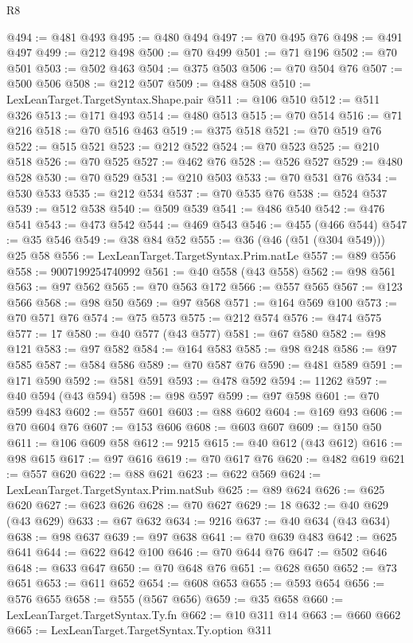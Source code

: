 \begin{lexlean}{R8}
\begin{coremodule}
@494 := @481 @493
@495 := @480 @494
@497 := @70 @495 @76
@498 := @491 @497
@499 := @212 @498
@500 := @70 @499
@501 := @71 @196
@502 := @70 @501
@503 := @502 @463
@504 := @375 @503
@506 := @70 @504 @76
@507 := @500 @506
@508 := @212 @507
@509 := @488 @508
@510 := LexLeanTarget.TargetSyntax.Shape.pair
@511 := @106 @510
@512 := @511 @326
@513 := @171 @493
@514 := @480 @513
@515 := @70 @514
@516 := @71 @216
@518 := @70 @516 @463
@519 := @375 @518
@521 := @70 @519 @76
@522 := @515 @521
@523 := @212 @522
@524 := @70 @523
@525 := @210 @518
@526 := @70 @525
@527 := @462 @76
@528 := @526 @527
@529 := @480 @528
@530 := @70 @529
@531 := @210 @503
@533 := @70 @531 @76
@534 := @530 @533
@535 := @212 @534
@537 := @70 @535 @76
@538 := @524 @537
@539 := @512 @538
@540 := @509 @539
@541 := @486 @540
@542 := @476 @541
@543 := @473 @542
@544 := @469 @543
@546 := @455 (@466 @544)
@547 := @35 @546
@549 := @38 @84 @52
@555 := @36 (@46 (@51 (@304 @549))) @25 @58
@556 := LexLeanTarget.TargetSyntax.Prim.natLe
@557 := @89 @556
@558 := 9007199254740992
@561 := @40 @558 (@43 @558)
@562 := @98 @561
@563 := @97 @562
@565 := @70 @563 @172
@566 := @557 @565
@567 := @123 @566
@568 := @98 @50
@569 := @97 @568
@571 := @164 @569 @100
@573 := @70 @571 @76
@574 := @75 @573
@575 := @212 @574
@576 := @474 @575
@577 := 17
@580 := @40 @577 (@43 @577)
@581 := @67 @580
@582 := @98 @121
@583 := @97 @582
@584 := @164 @583
@585 := @98 @248
@586 := @97 @585
@587 := @584 @586
@589 := @70 @587 @76
@590 := @481 @589
@591 := @171 @590
@592 := @581 @591
@593 := @478 @592
@594 := 11262
@597 := @40 @594 (@43 @594)
@598 := @98 @597
@599 := @97 @598
@601 := @70 @599 @483
@602 := @557 @601
@603 := @88 @602
@604 := @169 @93
@606 := @70 @604 @76
@607 := @153 @606
@608 := @603 @607
@609 := @150 @50
@611 := @106 @609 @58
@612 := 9215
@615 := @40 @612 (@43 @612)
@616 := @98 @615
@617 := @97 @616
@619 := @70 @617 @76
@620 := @482 @619
@621 := @557 @620
@622 := @88 @621
@623 := @622 @569
@624 := LexLeanTarget.TargetSyntax.Prim.natSub
@625 := @89 @624
@626 := @625 @620
@627 := @623 @626
@628 := @70 @627
@629 := 18
@632 := @40 @629 (@43 @629)
@633 := @67 @632
@634 := 9216
@637 := @40 @634 (@43 @634)
@638 := @98 @637
@639 := @97 @638
@641 := @70 @639 @483
@642 := @625 @641
@644 := @622 @642 @100
@646 := @70 @644 @76
@647 := @502 @646
@648 := @633 @647
@650 := @70 @648 @76
@651 := @628 @650
@652 := @73 @651
@653 := @611 @652
@654 := @608 @653
@655 := @593 @654
@656 := @576 @655
@658 := @555 (@567 @656)
@659 := @35 @658
@660 := LexLeanTarget.TargetSyntax.Ty.fn
@662 := @10 @311 @14
@663 := @660 @662
@665 := LexLeanTarget.TargetSyntax.Ty.option @311

\end{coremodule}
\end{lexlean}
